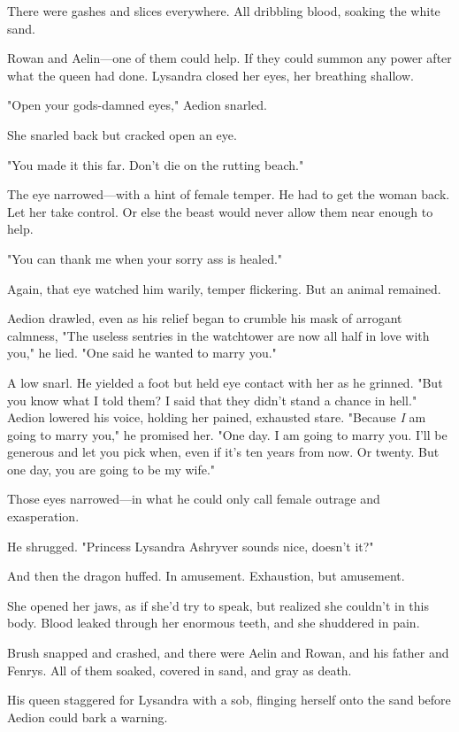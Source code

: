 There were gashes and slices everywhere. All dribbling blood, soaking the white sand.

Rowan and Aelin---one of them could help. If they could summon any power after what the queen had done. Lysandra closed her eyes, her breathing shallow.

"Open your gods-damned eyes," Aedion snarled.

She snarled back but cracked open an eye.

"You made it this far. Don't die on the rutting beach."

The eye narrowed---with a hint of female temper. He had to get the woman back. Let her take control. Or else the beast would never allow them near enough to help.

"You can thank me when your sorry ass is healed."

Again, that eye watched him warily, temper flickering. But an animal remained.

Aedion drawled, even as his relief began to crumble his mask of arrogant calmness, "The useless sentries in the watchtower are now all half in love with you," he lied. "One said he wanted to marry you."

A low snarl. He yielded a foot but held eye contact with her as he grinned. "But you know what I told them? I said that they didn't stand a chance in hell." Aedion lowered his voice, holding her pained, exhausted stare. "Because \emph{I} am going to marry you," he promised her. "One day. I am going to marry you. I'll be generous and let you pick when, even if it's ten years from now. Or twenty. But one day, you are going to be my wife."

Those eyes narrowed---in what he could only call female outrage and exasperation.

He shrugged. "Princess Lysandra Ashryver sounds nice, doesn't it?"

And then the dragon huffed. In amusement. Exhaustion, but 
amusement.

She opened her jaws, as if she'd try to speak, but realized she couldn't in this body. Blood leaked through her enormous teeth, and she shuddered in pain.

Brush snapped and crashed, and there were Aelin and Rowan, and his father and Fenrys. All of them soaked, covered in sand, and gray as death.

His queen staggered for Lysandra with a sob, flinging herself onto the sand before Aedion could bark a warning.


